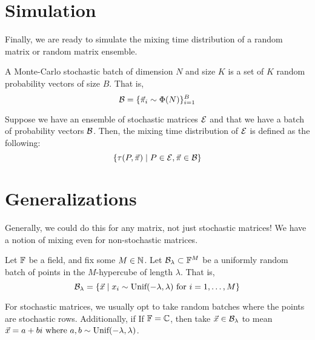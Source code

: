 
\newpage

\section{Simulation}

Finally, we are ready to simulate the mixing time distribution of a random matrix or random matrix ensemble.

\begin{definition}
A Monte-Carlo stochastic batch of dimension $N$ and size $K$ is a set of $K$ random probability vectors of size $B$. That is,
$$\B = \{\pivec_i \sim \Phi(N) \}_{i = 1}^{B}$$
\end{definition}



\begin{definition}
Suppose we have an ensemble of stochastic matrices $\Ens$ and that we have a batch of probability vectors $\B$.
Then, the mixing time distribution of $\Ens$ is defined as the following:
$$\{\tau(P, \pivec) \mid P \in \Ens, \pivec \in \B \}$$
\end{definition}


\section{Generalizations}

Generally, we could do this for any matrix, not just stochastic matrices! We have a notion of mixing even for non-stochastic matrices.

\begin{definition}
Let $\F$ be a field, and fix some $M \in \N$. Let $\B_\lambda \subset \F^M$ be a uniformly random batch of points in the $M$-hypercube of length $\lambda$. That is,
$$\B_\lambda = \{\vec{x} \mid x_i \sim \text{Unif}(-\lambda, \lambda) \text{ for } i = \oneto[M]\}$$
\end{definition}

For stochastic matrices, we usually opt to take random batches where the points are stochastic rows.
Additionally, if If $\F = \mathbb{C}$, then take $\vec{x} \in \B_\lambda$ to mean $\vec{x} = a + bi \text{ where } a,b \sim \Unif(-\lambda,\lambda)$.


